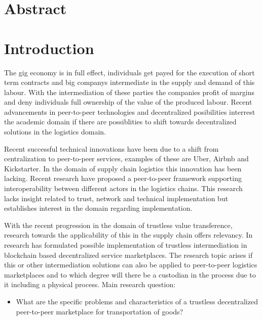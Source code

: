 \documentclass[Nomencl]{SelimArticle}
\begin{document}
\mytitlepage
\tableofcontents
\newpage

\section{Abstract}

\section{Introduction}

The gig economy is in full effect, individuals get payed for the execution of short term contracts and big companys intermediate in the supply and demand of this labour. With the intermediation of these parties the companies profit of margins and deny individuals full ownership of the value of the produced labour. Recent advancements in peer-to-peer technologies and decentralized posibilities interrest the academic domain if there are possiblities to shift towards decentralized solutions in the logistics domain\cite{research_demand}\cite{research_demand}\cite{research_demand}.\par
Recent successful technical innovations have been due to a shift from centralization to peer-to-peer services, examples of these are Uber, Airbnb and Kickstarter. In the domain of supply chain logistics this innovation has been lacking. Recent research \cite{peer-to-peerDecentralizedLogistics} have proposed a peer-to-peer framework supporting interoperability between different actors in the logistics chains. This research lacks insight related to trust, network and technical implementation but establishes interest in the domain regarding implementation. \par
With the recent progression in the domain of trustless value transference, research towards the applicability of this in the supply chain offers relevancy. In \cite{trustlessIntermediationInBCServiceMarket} research has formulated possible implementation of trustless intermediation in blockchain based decentralized service marketplaces. The research topic arises if this or other intermediation solutions can also be applied to peer-to-peer logistics marketplaces and to which degree will there be a custodian in the process due to it including a physical process.
\bigbreak
\noindent Main research question:
\begin{itemize}
  \item What are the specific problems and characteristics of a trustless decentralized peer-to-peer marketplace for transportation of goods?
\end{itemize}
\end{document}
